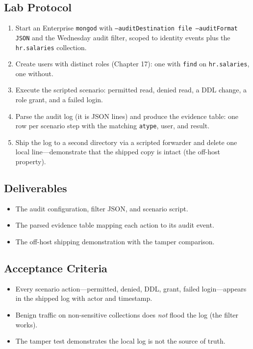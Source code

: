 \subsection{Lab Protocol}
\begin{enumerate}
    \item Start an Enterprise \texttt{mongod} with \texttt{--auditDestination file --auditFormat JSON} and the Wednesday audit filter, scoped to identity events plus the \texttt{hr.salaries} collection.
    \item Create users with distinct roles (Chapter 17): one with \texttt{find} on \texttt{hr.salaries}, one without.
    \item Execute the scripted scenario: permitted read, denied read, a DDL change, a role grant, and a failed login.
    \item Parse the audit log (it is JSON lines) and produce the evidence table: one row per scenario step with the matching \texttt{atype}, user, and result.
    \item Ship the log to a second directory via a scripted forwarder and delete one local line---demonstrate that the shipped copy is intact (the off-host property).
\end{enumerate}

\subsection*{Deliverables}
\begin{itemize}
    \item The audit configuration, filter JSON, and scenario script.
    \item The parsed evidence table mapping each action to its audit event.
    \item The off-host shipping demonstration with the tamper comparison.
\end{itemize}

\subsection*{Acceptance Criteria}
\begin{itemize}
    \item Every scenario action---permitted, denied, DDL, grant, failed login---appears in the shipped log with actor and timestamp.
    \item Benign traffic on non-sensitive collections does \emph{not} flood the log (the filter works).
    \item The tamper test demonstrates the local log is not the source of truth.
\end{itemize}

